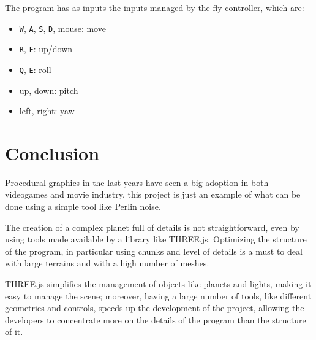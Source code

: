 \documentclass[paper=a4, fontsize=11pt]{scrartcl} %
\numberwithin{equation}{section} %
\numberwithin{figure}{section} %
\numberwithin{table}{section} %
\theoremstyle{definition}
\begin{document}
The program has as inputs the inputs managed by the fly controller, which are:

\begin{itemize}
	\item \texttt{W}, \texttt{A}, \texttt{S}, \texttt{D}, mouse: move
	\item \texttt{R}, \texttt{F}: up/down
	\item \texttt{Q}, \texttt{E}: roll
	\item up, down: pitch
	\item left, right: yaw
\end{itemize}


\section{Conclusion}

Procedural graphics in the last years have seen a big adoption in both videogames
and movie industry, this project is just an example of what can be done using
a simple tool like Perlin noise.

The creation of a complex planet full of details is not straightforward, even
by using tools made available by a library like THREE.js. Optimizing the structure of the program, in particular using chunks and
level of details is a must to deal with large terrains and with a high number
of meshes.

THREE.js simplifies the management of objects like planets and lights, making
it easy to manage the scene; moreover, having a large number of tools, like
different geometries and controls, speeds up the development of the project,
allowing the developers to concentrate more on the details of the program
than the structure of it.


\newpage



\end{document}
